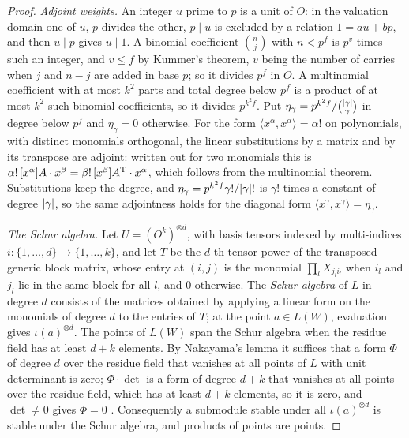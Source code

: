 \begin{proof}
\emph{Adjoint weights.} An integer $u$ prime to $p$ is a unit of $O$: in the valuation domain one of $u$, $p$ divides the other, $p\mid u$ is excluded by a relation $1=au+bp$, and then $u\mid p$ gives $u\mid1$. A binomial coefficient $\binom nj$ with
$n<p^f$ is $p^v$ times such an integer, and $v\le f$ by Kummer's theorem, $v$ being the number of carries when $j$ and $n-j$ are added in base $p$; so it divides $p^f$ in $O$. A multinomial coefficient with at most $k^2$ parts and total degree below
$p^f$ is a product of at most $k^2$ such binomial coefficients, so it divides $p^{k^2f}$. Put $\eta_\gamma=p^{k^2f}/\binom{\lvert \gamma\rvert}\gamma$ in degree below $p^f$ and $\eta_\gamma=0$ otherwise. For the form $\langle x^\alpha,x^\alpha\rangle=\alpha!$ on polynomials, with distinct
monomials orthogonal, the linear substitutions by a matrix and by its transpose are adjoint: written out for two monomials this is $\alpha!\,[x^\alpha]A\cdot x^\beta=\beta!\,[x^\beta]A^{\rm T}\cdot x^\alpha$, which follows from the multinomial theorem. Substitutions keep the degree, and
$\eta_\gamma=p^{k^2f}\gamma!/\lvert \gamma\rvert!$ is $\gamma!$ times a constant of degree $\lvert \gamma\rvert$, so the same adjointness holds for the diagonal form $\langle x^\gamma,x^\gamma\rangle=\eta_\gamma$.

\emph{The Schur algebra.} Let $U=(O^k)^{\otimes d}$, with basis tensors indexed by multi-indices $i\colon\{1,\dots,d\}\to\{1,\dots,k\}$, and let $T$ be the $d$-th tensor power of the transposed generic block matrix, whose entry at $(i,j)$ is the monomial
$\prod_lX_{j_li_l}$ when $i_l$ and $j_l$ lie in the same block for all $l$, and $0$ otherwise. The \emph{Schur algebra} of $L$ in degree $d$ consists of the matrices obtained by applying a linear form on the monomials of degree $d$ to the entries of $T$;
at the point $a\in L(W)$, evaluation gives $\iota(a)^{\otimes d}$. The points of $L(W)$ span the Schur algebra when the residue field has at least $d+k$ elements. By Nakayama's lemma it suffices that a form $\Phi$ of degree $d$ over the residue field
that vanishes at all points of $L$ with unit determinant is zero; $\Phi\cdot\det$ is a form of degree $d+k$ that vanishes at all points over the residue field, which has at least $d+k$ elements, so it is zero, and $\det\ne0$ gives $\Phi=0$
\cite{Green1980}. Consequently a submodule stable under all $\iota(a)^{\otimes d}$ is stable under the Schur algebra, and products of points are points.


\end{proof}
